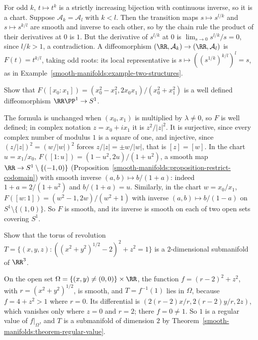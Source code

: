 \begin{solution}
For odd $k$, $t \mapsto t^k$ is a strictly increasing bijection with continuous inverse, so it is a chart. Suppose $\mathcal{A}_k = \mathcal{A}_l$ with $k < l$.
Then the transition maps $s \mapsto s^{l/k}$ and $s \mapsto s^{k/l}$ are smooth and inverse to each other, so by the chain rule the product of their derivatives
at $0$ is $1$. But the derivative of $s^{l/k}$ at $0$ is $\lim_{s \to 0}s^{l/k}/s = 0$, since $l/k > 1$, a contradiction. A diffeomorphism
$(\RR, \mathcal{A}_k) \to (\RR, \mathcal{A}_l)$ is $F(t) = t^{k/l}$, taking odd roots: its local representative is $s \mapsto ((s^{1/k})^{k/l})^l = s$, as in
Example~\ref{smooth-manifolds:example-two-structures}.
\end{solution}

\begin{exercise}\label{smooth-manifolds:exercise-rp1-circle}
Show that $F([x_0 : x_1]) = (x_0^2 - x_1^2, 2x_0x_1)/(x_0^2 + x_1^2)$ is a well defined diffeomorphism $\RR\PP^1 \to S^1$.
\end{exercise}

\begin{solution}
The formula is unchanged when $(x_0, x_1)$ is multiplied by $\lambda \neq 0$, so $F$ is well defined; in complex notation $z = x_0 + ix_1$ it is
$z^2/|z|^2$. It is surjective, since every complex number of modulus $1$ is a square of one, and injective, since $(z/|z|)^2 = (w/|w|)^2$ forces
$z/|z| = \pm w/|w|$, that is $[z] = [w]$. In the chart $u = x_1/x_0$, $F([1 : u]) = (1 - u^2, 2u)/(1 + u^2)$, a smooth map $\RR \to S^1 \setminus \{(-1, 0)\}$
(Proposition~\ref{smooth-manifolds:proposition-restrict-codomain}) with smooth inverse $(a, b) \mapsto b/(1 + a)$: indeed $1 + a = 2/(1 + u^2)$ and
$b/(1 + a) = u$. Similarly, in the chart $w = x_0/x_1$, $F([w : 1]) = (w^2 - 1, 2w)/(w^2 + 1)$ with inverse $(a, b) \mapsto b/(1 - a)$ on
$S^1 \setminus \{(1, 0)\}$. So $F$ is smooth, and its inverse is smooth on each of two open sets covering $S^1$.
\end{solution}

\begin{exercise}\label{smooth-manifolds:exercise-torus-revolution}
Show that the torus of revolution $T = \{(x, y, z) : ((x^2 + y^2)^{1/2} - 2)^2 + z^2 = 1\}$ is a $2$-dimensional submanifold of $\RR^3$.
\end{exercise}

\begin{solution}
On the open set $\Omega = \{(x, y) \neq (0, 0)\} \times \RR$, the function $f = (r - 2)^2 + z^2$, with $r = (x^2 + y^2)^{1/2}$, is smooth, and $T = f^{-1}(1)$ lies
in $\Omega$, because $f = 4 + z^2 > 1$ where $r = 0$. Its differential is $(2(r - 2)x/r, 2(r - 2)y/r, 2z)$, which vanishes only where $z = 0$ and $r = 2$; there
$f = 0 \neq 1$. So $1$ is a regular value of $f|_\Omega$, and $T$ is a submanifold of dimension $2$ by Theorem~\ref{smooth-manifolds:theorem-regular-value}.
\end{solution}

